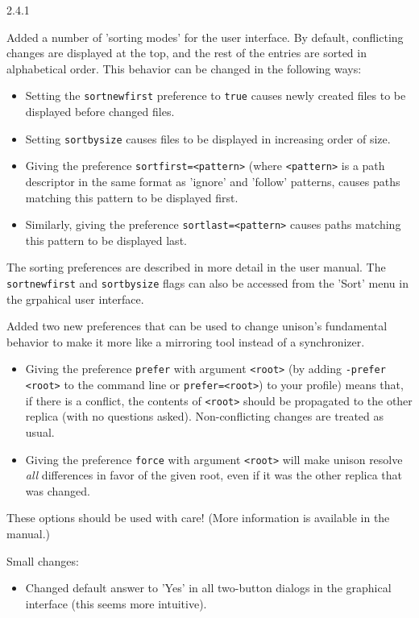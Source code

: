 \begin{changesfromversion}{2.4.1}
\item Added a number of 'sorting modes' for the user interface.  By
default, conflicting changes are displayed at the top, and the rest of
the entries are sorted in alphabetical order.  This behavior can be
changed in the following ways:
\begin{itemize}
\item Setting  the \verb|sortnewfirst| preference to \verb|true| causes
newly created files to be displayed before changed files.
\item Setting \verb|sortbysize| causes files to be displayed in
increasing order of size.
\item Giving the preference \verb|sortfirst=<pattern>| (where
\verb|<pattern>| is a path descriptor in the same format as 'ignore' and 'follow'
patterns, causes paths matching this pattern to be displayed first.
\item Similarly, giving the preference \verb|sortlast=<pattern>|
causes paths matching this pattern to be displayed last.
\end{itemize}
The sorting preferences are described in more detail in the user manual.
The \verb|sortnewfirst| and \verb|sortbysize| flags can also be accessed
from the 'Sort' menu in the grpahical user interface.

\item Added two new preferences that can be used to change unison's
fundamental behavior to make it more like a mirroring tool instead of
a synchronizer.
\begin{itemize}
\item Giving the preference \verb|prefer| with argument \verb|<root>|
(by adding \verb|-prefer <root>| to the command line or \verb|prefer=<root>|)
to your profile) means that, if there is a conflict, the contents of
\verb|<root>|
should be propagated to the other replica (with no questions asked).
Non-conflicting changes are treated as usual.
\item Giving the preference \verb|force| with argument \verb|<root>|
will make unison resolve {\em all} differences in favor of the given
root, even if it was the other replica that was changed.
\end{itemize}
These options should be used with care!  (More information is available in
the manual.)

\item Small changes:
\begin{itemize}
\item
Changed default answer to 'Yes' in all two-button dialogs in the
  graphical interface (this seems more intuitive).


\end{itemize}
\end{changesfromversion}
